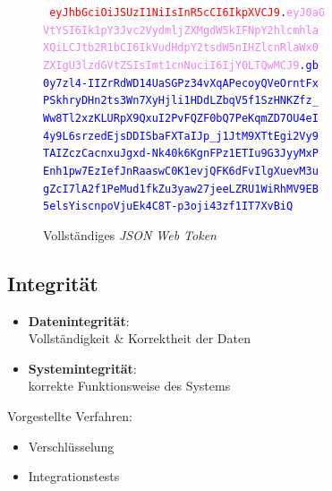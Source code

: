 \documentclass{beamer}
\begin{document}
\begin{frame}{\insertsubsection}
	\begin{figure}
		{\tt \textcolor{red}{
				eyJhbGciOiJSUzI1NiIsInR5cCI6IkpXVCJ9}.\textcolor{violet}{eyJ0aG\\
				VtYSI6Ik1pY3Jvc2VydmljZXMgdW5kIFNpY2hlcmhla\\
				XQiLCJtb2R1bCI6IkVudHdpY2tsdW5nIHZlcnRlaWx0\\
				ZXIgU3lzdGVtZSIsImt1cnNuciI6IjY0LTQwMCJ9}.\textcolor{blue}{gb\\
				0y7zl4-IIZrRdWD14UaSGPz34vXqAPecoyQVeOrntFx\\
				PSkhryDHn2ts3Wn7XyHjli1HDdLZbqV5f1SzHNKZfz\_\\
				Ww8Tl2xzKLURpX9QxuI2PvFQZF0bQ7PeKqmZD7OU4eI\\
				4y9L6srzedEjsDDISbaFXTaIJp\_j1JtM9XTtEgi2Vy9\\
				TAIZczCacnxuJgxd-Nk40k6KgnFPz1ETIu9G3JyyMxP\\
				Enh1pw7EzIefJnRaaswC0K1evjQFK6dFvIlgXuevM3u\\
				gZcI7lA2f1PeMud1fkZu3yaw27jeeLZRU1WiRhMV9EB\\
				5elsYiscnpoVjuEk4C8T-p3oji43zf1IT7XvBiQ}}
		\caption{Vollständiges \textit{JSON Web Token}}
	\end{figure}
\end{frame}

\subsection{Integrität}
\begin{frame}{\insertsubsection}
	\begin{itemize}
		\setlength\itemsep{1em}
		\item \textbf{Datenintegrität}:\\
			Vollständigkeit \& Korrektheit der Daten
		\item \textbf{Systemintegrität}:\\
			korrekte Funktionsweise des Systems
	\end{itemize}
	\vspace*{2em}
	\pause
	Vorgestellte Verfahren:
	\begin{itemize}
		\item Verschlüsselung
		\item Integrationstests
	\end{itemize}
\end{frame}
\end{document}
